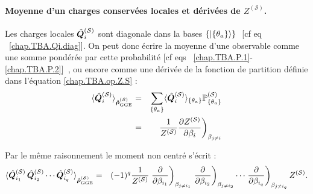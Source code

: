 \paragraph{Moyenne d’un charges conservées locales et dérivées de $Z^{(\mathcal{S})}$.} Les charges locales $\hat{\bm{Q}}_i^{(\mathcal{S})}$ sont diagonale dans la bases \( \{ \ket{\{\theta_a \}} \}  \) [cf eq~ ~\eqref{chap.TBA.Qi.diag}]. 
On peut donc  écrire la moyenne d’une observable comme une somme pondérée par cette probabilité [cf eqs ~\eqref{chap.TBA.P.1}-\eqref{chap.TBA.P.2}] , ou encore comme une dérivée de la fonction de partition définie dans l'équation \eqref{chap.TBA.op.Z.S} :
\begin{eqnarray}
	\langle \hat{\bm{Q}}_i^{(\mathcal{S})} \rangle_{\hat{\bm{\rho}}^{(\mathcal{S})}_{\mathrm{GGE}}} &= & \sum_{\{ \theta_a\}} \langle \hat{\bm{Q}}_i^{(\mathcal{S})} \rangle_{\{\theta_a \}} \mathbb{P}^{(\mathcal{S})}_{\{ \theta_a \}} \label{chap.TBA.moy.1}\\
	 & = &  \left. \frac{1}{Z^{(\mathcal{S})}} \frac{\partial Z^{(\mathcal{S})}}{\partial \beta_i} \right )_{\beta_{j \neq i }}	 \label{chap.TBA.moy.2}
\end{eqnarray}

Par le même raisonnement le moment non centré s'écrit :
\begin{eqnarray}
	\braket{ \hat{\bm{Q}}_{i_1}^{(\mathcal{S})} \, \hat{\bm{Q}}_{i_2}^{(\mathcal{S})} \cdots \hat{\bm{Q}}_{i_q}^{(\mathcal{S})} }_{\hat{\bm{\rho}}^{(\mathcal{S})}_{\mathrm{GGE}}} &= &  (-1)^q \frac{1}{Z^{(\mathcal{S})}} \left.\frac{\partial}{\partial \beta_{i_1}} \right )_{\beta_{j \neq i_1 }} \left.\frac{\partial}{\partial \beta_{i_2}} \right )_{\beta_{j \neq i_2 }} \cdots \left.\frac{\partial}{\partial \beta_{i_q}} \right )_{\beta_{j \neq i_q }} Z^{(\mathcal{S})} \label{chap.TBA.mom.1}.	
\end{eqnarray}

